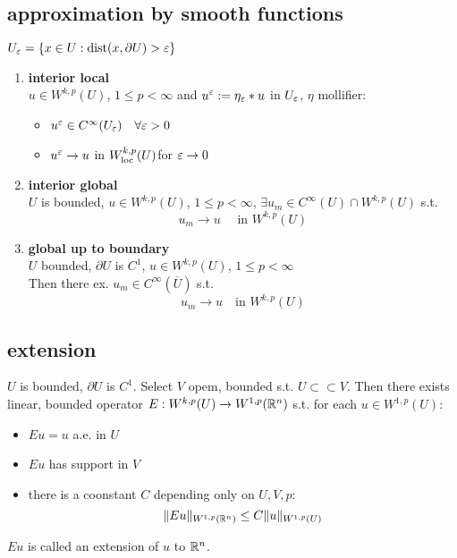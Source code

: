 \subsection{approximation by smooth functions}

$U_\varepsilon = \{x \in U: \text{dist}(x,\partial U ) > \varepsilon \}$

\begin{enumerate}[label=(\alph*)]
	\item \textbf{interior local}\\
	$u \in W^{k,p}(U)$, $1 \leq p < \infty$ and $u^{\varepsilon}:= \eta_{\varepsilon} * u$ in $U_{\varepsilon}$, $\eta$ mollifier:
	\begin{itemize}
		\item $u^\varepsilon \in C^\infty(U_\varepsilon) \quad \forall \varepsilon >0$
		\item $u^\varepsilon \to u$ in $W^{k,p}_{\text{loc}}(U)$\quad for $\varepsilon \to 0$
	\end{itemize}

	\item \textbf{interior global}\\
	$U$ is bounded, $u \in W^{k,p}(U)$, $1\leq p < \infty $, $\exists u_m \in C^\infty(U) \cap W^{k,p}(U)$ s.t.
	\begin{equation*}
		u_m \to u \quad \text{ in } W^{k,p}(U)
	\end{equation*} 
	
	\item \textbf{global up to boundary}\\
	$U$ bounded, $\partial U $ is $C^1$, $u \in W^{k,p}(U)$, $1 \leq p < \infty$\\
	Then there ex. $u_m \in C^\infty(\overline{U})$ s.t. 
	\begin{equation*}
		u_m \to u \quad \text{in } W^{k,p}(U)
	\end{equation*}
	
	
\end{enumerate}

\subsection{extension}

$U$ is bounded, $\partial U$ is $C^1$. Select $V$ opem, bounded s.t. $U \subset \subset V$. Then there exists linear, bounded operator $E: W^{k,p}(U) \to W^{1,p}(\mathbb{R}^n)$ s.t. for each $u \in W^{1,p}(U)$:
\begin{itemize}
	\item $Eu = u$ a.e. in $U$
	\item $Eu$ has support in  $V$  
	\item there is a coonstant $C$ depending only on $U,V,p$:
	\begin{equation*}
		\|Eu\|_{W^{1,p}(\mathbb{R}^n)} \leq C \|u\|_{W^{1,p}(U)}
	\end{equation*}
\end{itemize}
$Eu$ is called an extension of $u$ to $\mathbb{R}^n$. 

